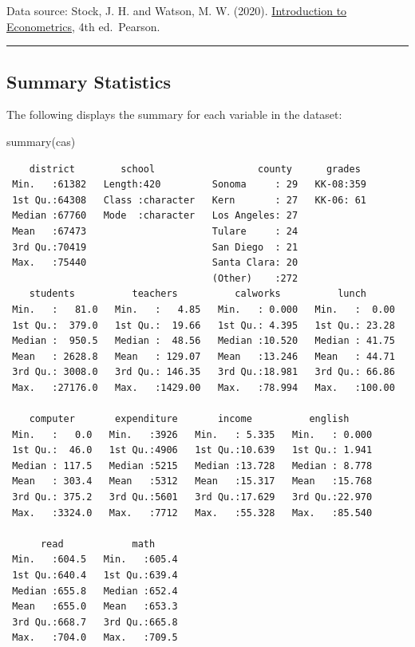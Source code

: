\documentclass[
  12pt,
  letterpaper,
]{scrbook}
\newenvironment{Shaded}{\begin{snugshade}}{\end{snugshade}}
\newcommand{\FunctionTok}[1]{\textcolor[rgb]{0.28,0.35,0.67}{#1}}
\newcommand{\NormalTok}[1]{\textcolor[rgb]{0.00,0.23,0.31}{#1}}
\theoremstyle{plain}
\theoremstyle{definition}
\theoremstyle{remark}
\begin{document}
Data source: Stock, J. H. and Watson, M. W. (2020).
\href{https://www.sea-stat.com/wp-content/uploads/2020/08/James-H.-Stock-Mark-W.-Watson-Introduction-to-Econometrics-Global-Edition-Pearson-Education-Limited-2020.pdf}{Introduction
to Econometrics}, 4th ed.~Pearson.

\begin{center}\rule{0.5\linewidth}{0.5pt}\end{center}

\subsection{Summary Statistics}\label{summary-statistics}

The following displays the summary for each variable in the dataset:

\begin{Shaded}
\begin{Highlighting}[]
\FunctionTok{summary}\NormalTok{(cas)}
\end{Highlighting}
\end{Shaded}

\begin{verbatim}
    district        school                  county      grades   
 Min.   :61382   Length:420         Sonoma     : 29   KK-08:359  
 1st Qu.:64308   Class :character   Kern       : 27   KK-06: 61  
 Median :67760   Mode  :character   Los Angeles: 27              
 Mean   :67473                      Tulare     : 24              
 3rd Qu.:70419                      San Diego  : 21              
 Max.   :75440                      Santa Clara: 20              
                                    (Other)    :272              
    students          teachers          calworks          lunch       
 Min.   :   81.0   Min.   :   4.85   Min.   : 0.000   Min.   :  0.00  
 1st Qu.:  379.0   1st Qu.:  19.66   1st Qu.: 4.395   1st Qu.: 23.28  
 Median :  950.5   Median :  48.56   Median :10.520   Median : 41.75  
 Mean   : 2628.8   Mean   : 129.07   Mean   :13.246   Mean   : 44.71  
 3rd Qu.: 3008.0   3rd Qu.: 146.35   3rd Qu.:18.981   3rd Qu.: 66.86  
 Max.   :27176.0   Max.   :1429.00   Max.   :78.994   Max.   :100.00  
                                                                      
    computer       expenditure       income          english      
 Min.   :   0.0   Min.   :3926   Min.   : 5.335   Min.   : 0.000  
 1st Qu.:  46.0   1st Qu.:4906   1st Qu.:10.639   1st Qu.: 1.941  
 Median : 117.5   Median :5215   Median :13.728   Median : 8.778  
 Mean   : 303.4   Mean   :5312   Mean   :15.317   Mean   :15.768  
 3rd Qu.: 375.2   3rd Qu.:5601   3rd Qu.:17.629   3rd Qu.:22.970  
 Max.   :3324.0   Max.   :7712   Max.   :55.328   Max.   :85.540  
                                                                  
      read            math      
 Min.   :604.5   Min.   :605.4  
 1st Qu.:640.4   1st Qu.:639.4  
 Median :655.8   Median :652.4  
 Mean   :655.0   Mean   :653.3  
 3rd Qu.:668.7   3rd Qu.:665.8  
 Max.   :704.0   Max.   :709.5  
                                
\end{verbatim}
\end{document}
